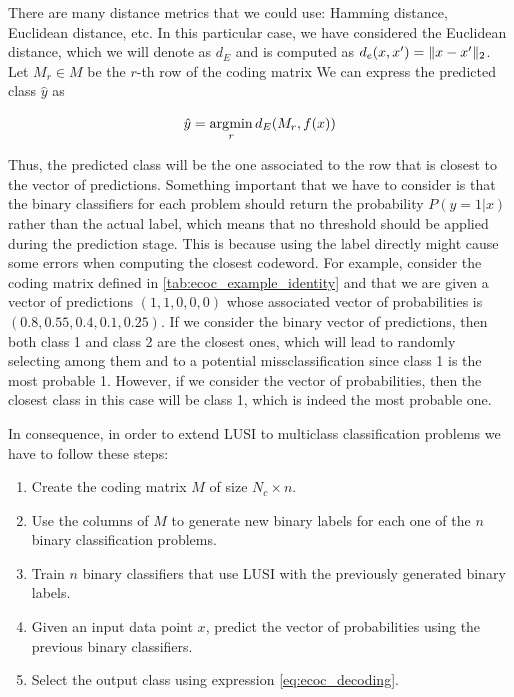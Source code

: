 There are many distance metrics that we could use: Hamming distance, Euclidean distance, etc. In this
particular case, we have considered the Euclidean distance, which we will denote as $d_E$ and is computed
as $d_e(x, x') = \lVert x - x' \rVert_2$. Let $M_r \in M$ be the $r$-th row of the coding matrix
We can express the predicted class $\hat{y}$ as

\begin{equation}
    \label{eq:ecoc_decoding}
    \hat{y} = \operatorname*{\arg\!\min}_r d_E(M_r, f(x))
\end{equation}

Thus, the predicted class will be the one associated to the row that is closest to the vector of predictions.
Something important that we have to consider is that the binary classifiers for each problem should return the
probability $P(y=1 | x)$ rather than the actual label, which means that no threshold should be applied
during the prediction stage. This is because using the label directly might cause some errors when computing
the closest codeword. For example, consider the coding matrix defined in \ref{tab:ecoc_example_identity} and that
we are given a vector of predictions $(1, 1, 0, 0, 0)$ whose associated vector of probabilities is
$(0.8, 0.55, 0.4, 0.1, 0.25)$. If we consider the binary vector of predictions, then both class 1 and
class 2 are the closest ones, which will lead to randomly selecting among them and to a potential missclassification
since class 1 is the most probable 1. However, if we consider the vector of probabilities, then the closest
class in this case will be class 1, which is indeed the most probable one.

In consequence, in order to extend LUSI to multiclass classification problems we have to follow these steps:

\begin{enumerate}[label=\textbf{Step \arabic*:}]
    \item Create the coding matrix $M$ of size $N_c \times n$.
    \item Use the columns of $M$ to generate new binary labels for each one of the $n$ binary classification problems.
    \item Train $n$ binary classifiers that use LUSI with the previously generated binary labels.
    \item Given an input data point $x$, predict the vector of probabilities using the previous binary classifiers.
    \item Select the output class using expression \eqref{eq:ecoc_decoding}.
\end{enumerate}
